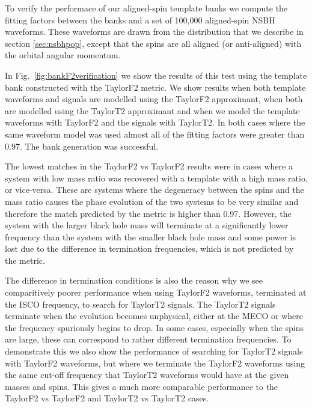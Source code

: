 To verify the performace of our aligned-spin template banks we compute the
fitting factors between the banks and a set of 100,000 aligned-spin \ac{NSBH}
waveforms. These waveforms are drawn from the
distribution that we describe in section \ref{sec:nsbhpop}, except that the
spins are all aligned (or anti-aligned) with the orbital angular momentum.

In Fig.~\ref{fig:bankF2verification} we show the results of this test using
the template bank constructed with the TaylorF2 metric. We show results when
both template waveforms and signals are modelled using the TaylorF2
approximant, when both are modelled using the TaylorT2 approximant and when we
model the template waveforms with TaylorF2 and the signals with TaylorT2.
In both cases where the same waveform model was used almost all of the fitting
factors were greater than 0.97. The bank generation was successful.

The lowest matches in the TaylorF2 vs TaylorF2 results were in cases
where a system with low mass ratio was recovered with a template with a high
mass ratio, or vice-versa. These are systems where the degeneracy between the
spins and the mass ratio \cite{Baird:2012cu} causes
the phase evolution of the two systems to be very similar and therefore the
match predicted by the metric is higher than 0.97.
However, the system with the larger black hole mass will terminate at a 
significantly lower frequency than the system with the smaller black hole mass
and some power is lost due to the difference in termination frequencies, which
is not predicted by the metric.

The difference in termination conditions is also the reason why we see
comparitively poorer performance when using TaylorF2 waveforms, terminated
at the \ac{ISCO} frequency, to search for TaylorT2 signals. The TaylorT2
signals terminate when the evolution becomes unphysical,
either at the \ac{MECO} or where the frequency spuriously begins to drop. In
some cases, especially when the spins
are large, these can correspond to rather different termination frequencies. To
demonstrate this we also show the performance
of searching for TaylorT2 signals with TaylorF2 waveforms,
but where we terminate the TaylorF2 waveforms using the same cut-off frequency
that TaylorT2 waveforms would have at the given masses and spins.
This gives a much more comparable performance to the TaylorF2 vs TaylorF2
and TaylorT2 vs TaylorT2 cases.


